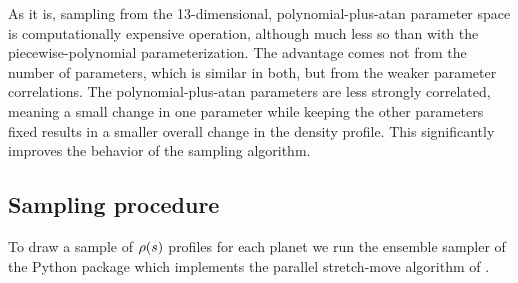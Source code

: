 As it is, sampling from the 13-dimensional, polynomial-plus-atan parameter space
is computationally expensive operation, although much less so than with the
piecewise-polynomial parameterization. The advantage comes not from the number
of parameters, which is similar in both, but from the weaker parameter
correlations. The polynomial-plus-atan parameters are less strongly correlated,
meaning a small change in one parameter while keeping the other parameters fixed
results in a smaller overall change in the density profile. This significantly
improves the behavior of the sampling algorithm.

\subsection{Sampling procedure}\label{sec:mcmc}
To draw a sample of $\rho(s)$ profiles for each planet we run the ensemble
sampler of the  Python package \citep{Foreman-Mackey2013} which
implements the parallel stretch-move algorithm of \citet{Goodman2010}.